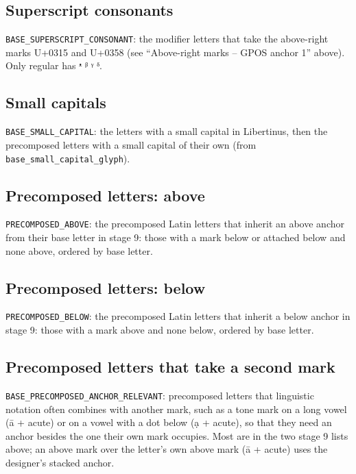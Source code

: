\documentclass[landscape]{article}
\begin{document}


\subsection*{Superscript consonants}

\texttt{BASE\_SUPERSCRIPT\_CONSONANT}: the modifier letters that take the above-right marks U+0315 and U+0358
(see ``Above-right marks -- GPOS anchor 1'' above).
Only regular has ᵜ ᵝ ᵞ ᵟ.



\subsection*{Small capitals}

\texttt{BASE\_SMALL\_CAPITAL}: the letters with a small capital in Libertinus,
then the precomposed letters with a small capital of their own (from \texttt{base\_small\_capital\_glyph}).



\subsection*{Precomposed letters: above}

\texttt{PRECOMPOSED\_ABOVE}: the precomposed Latin letters that inherit an above anchor from their base letter in stage 9:
those with a mark below or attached below and none above, ordered by base letter.



\subsection*{Precomposed letters: below}

\texttt{PRECOMPOSED\_BELOW}: the precomposed Latin letters that inherit a below anchor in stage 9:
those with a mark above and none below, ordered by base letter.



\subsection*{Precomposed letters that take a second mark}

\texttt{BASE\_PRECOMPOSED\_ANCHOR\_RELEVANT}: precomposed letters that linguistic notation often combines with another mark,
such as a tone mark on a long vowel (ā + acute) or on a vowel with a dot below (ạ + acute),
so that they need an anchor besides the one their own mark occupies.
Most are in the two stage 9 lists above; an above mark over the letter's own above mark (ā + acute)
uses the designer's stacked anchor.
\end{document}
